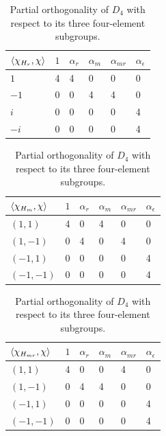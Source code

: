 \documentclass[two column]{article}
\begin{document}
\begin{table}[h]
\centering
\begin{tabular}{|l|lllll|}\hline
  $\braket{\chi_{H_r}, \chi}$ & $1$ & $\alpha_{r}$ & $\alpha_{m}$ & $\alpha_{mr}$ & $\alpha_{\epsilon}$ \\ \hline
$1$ & 4   & 4            & 0             & 0               & 0                   \\ 
$-1$ & 0   & 0            & 4             & 4               & 0                   \\ 
$i$ & 0   & 0            & 0             & 0               & 4                   \\ 
$-i$ & 0   & 0            & 0             & 0               & 4                   \\ \hline
\end{tabular}

\begin{tabular}{|l|lllll|}\hline
  $\braket{\chi_{H_m}, \chi}$ & $1$ & $\alpha_{r}$ & $\alpha_{m}$ & $\alpha_{mr}$ & $\alpha_{\epsilon}$ \\ \hline
$(1,1)$ & 4   & 0            & 4             & 0               & 0                   \\ 
$ (1,-1)$ & 0   & 4            & 0             & 4               & 0                   \\ 
$(-1,1)$ & 0   & 0            & 0             & 0               & 4                   \\ 
$(-1,-1)$ & 0   & 0            & 0             & 0               & 4                   \\ \hline
\end{tabular}
\begin{tabular}{|l|lllll|}\hline
  $\braket{\chi_{H_{mr}}, \chi}$ & $1$ & $\alpha_{r}$ & $\alpha_{m}$ & $\alpha_{mr}$ & $\alpha_{\epsilon}$ \\ \hline
$(1,1)$ & 4   & 0            & 0             & 4               & 0                   \\ 
$ (1,-1)$ & 0   & 4            & 4             & 0               & 0                   \\ 
$(-1,1)$ & 0   & 0            & 0             & 0               & 4                   \\ 
$(-1,-1)$ & 0   & 0            & 0             & 0               & 4                   \\ \hline
\end{tabular}
\caption{Partial orthogonality of $D_4$ with respect to its three four-element subgroups.}
\label{tab:red_ch}
\end{table}
\end{document}
